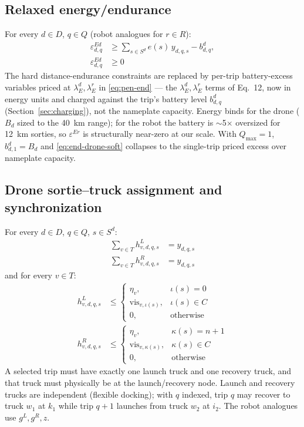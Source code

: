 \documentclass[10pt]{article}
\begin{document}
\subsection{Relaxed energy/endurance}
\label{sec:rel-end}
For every $d\in D$, $q\in Q$ (robot analogues for $r\in R$):
\begin{align}
\varepsilon^{Ed}_{d,q} &\ge \sum_{s\in S^d} e(s)\,y_{d,q,s} - b^d_{d,q}, \label{eq:end-drone-soft}\\
\varepsilon^{Ed}_{d,q} &\ge 0 \label{eq:end-drone-nonneg}
\end{align}
\noindent The hard distance-endurance constraints are replaced by per-trip
battery-excess variables priced at $\lambda^d_E, \lambda^r_E$ in
\eqref{eq:pen-end} --- the $\lambda^d_E, \lambda^r_E$ terms of Eq.~12, now in
energy units and charged against the trip's battery level $b^d_{d,q}$
(Section~\ref{sec:charging}), not the nameplate capacity. Energy binds
for the drone ($B_d$ sized to the 40~km range); for the robot the battery is
$\sim$5$\times$ oversized for 12~km sorties, so $\varepsilon^{Er}$ is
structurally near-zero at our scale. With $Q_{\max}=1$,
$b^d_{d,1} = B_d$ and \eqref{eq:end-drone-soft} collapses to the single-trip
priced excess over nameplate capacity.

\subsection{Drone sortie--truck assignment and synchronization}
\label{sec:sync}
For every $d\in D$, $q\in Q$, $s\in S^d$:
\begin{align}
\sum_{v\in T} h^L_{v,d,q,s} &= y_{d,q,s} \label{eq:drone-launch-assign}\\
\sum_{v\in T} h^R_{v,d,q,s} &= y_{d,q,s} \label{eq:drone-recover-assign}
\end{align}
and for every $v\in T$:
\begin{align}
h^L_{v,d,q,s} &\le
\begin{cases}
\eta_v, & \iota(s) = 0\\
\mathrm{vis}_{v,\iota(s)}, & \iota(s)\in C\\
0, & \text{otherwise}
\end{cases} \label{eq:drone-launch-sync}\\
h^R_{v,d,q,s} &\le
\begin{cases}
\eta_v, & \kappa(s) = n+1\\
\mathrm{vis}_{v,\kappa(s)}, & \kappa(s)\in C\\
0, & \text{otherwise}
\end{cases} \label{eq:drone-recover-sync}
\end{align}
\noindent A selected trip must have exactly one launch truck and one recovery
truck, and that truck must physically be at the launch/recovery node. Launch
and recovery trucks are independent (flexible docking); with $q$ indexed, trip
$q$ may recover to truck $w_1$ at $k_1$ while trip $q+1$ launches from truck
$w_2$ at $i_2$. The robot analogues use $g^L, g^R, z$.
\end{document}
